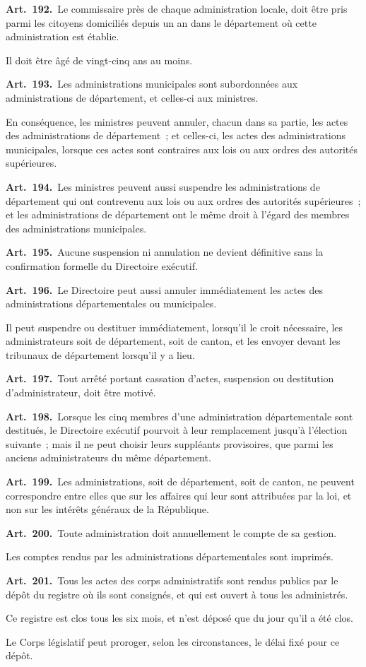 \documentclass[french,twoside]{book} %
\newcommand{\labelchar}[1]{\textbf{\color{rubric} #1}}
\begin{document}
\labelchar{Art. 192.} Le commissaire près de chaque administration locale, doit être pris parmi les citoyens domiciliés depuis un an dans le département où cette administration est établie.\par
Il doit être âgé de vingt-cinq ans au moins.\par
\labelchar{Art. 193.} Les administrations municipales sont subordonnées aux administrations de département, et celles-ci aux ministres.\par
En conséquence, les ministres peuvent annuler, chacun dans sa partie, les actes des administrations de département ; et celles-ci, les actes des administrations municipales, lorsque ces actes sont contraires aux lois ou aux ordres des autorités supérieures.\par
\labelchar{Art. 194.} Les ministres peuvent aussi suspendre les administrations de département qui ont contrevenu aux lois ou aux ordres des autorités supérieures ; et les administrations de département ont le même droit à l’égard des membres des administrations municipales.\par
\labelchar{Art. 195.} Aucune suspension ni annulation ne devient définitive sans la confirmation formelle du Directoire exécutif.\par
\labelchar{Art. 196.} Le Directoire peut aussi annuler immédiatement les actes des administrations départementales ou municipales.\par
Il peut suspendre ou destituer immédiatement, lorsqu’il le croit nécessaire, les administrateurs soit de département, soit de canton, et les envoyer devant les tribunaux de département lorsqu’il y a lieu.\par
\labelchar{Art. 197.} Tout arrêté portant cassation d’actes, suspension ou destitution d’administrateur, doit être motivé.\par
\labelchar{Art. 198.} Lorsque les cinq membres d’une administration départementale sont destitués, le Directoire exécutif pourvoit à leur remplacement jusqu’à l’élection suivante ; mais il ne peut choisir leurs suppléants provisoires, que parmi les anciens administrateurs du même département.\par
\labelchar{Art. 199.} Les administrations, soit de département, soit de canton, ne peuvent correspondre entre elles que sur les affaires qui leur sont attribuées par la loi, et non sur les intérêts généraux de la République.\par
\labelchar{Art. 200.} Toute administration doit annuellement le compte de sa gestion.\par
Les comptes rendus par les administrations départementales sont imprimés.\par
\labelchar{Art. 201.} Tous les actes des corps administratifs sont rendus publics par le dépôt du registre où ils sont consignés, et qui est ouvert à tous les administrés.\par
Ce registre est clos tous les six mois, et n’est déposé que du jour qu’il a été clos.\par
Le Corps législatif peut proroger, selon les circonstances, le délai fixé pour ce dépôt.
\end{document}
